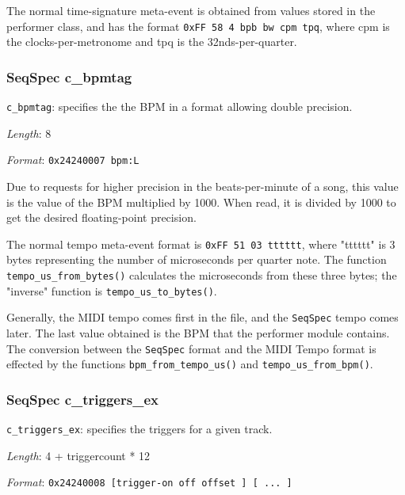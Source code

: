    The normal time-signature meta-event is obtained from values stored in
   the performer class, and has the format
   \texttt{0xFF 58 4 bpb bw cpm tpq}, where cpm is the clocks-per-metronome
   and tpq is the 32nds-per-quarter.

\subsubsection{SeqSpec c\_bpmtag}
\label{subsubsec:midi_format_track_seqspec_bpmtag}


   \begin{description}
      \item \texttt{c\_bpmtag}: specifies the the BPM in a format allowing double
         precision.
      \item \textsl{Length}: 8
      \item \textsl{Format}: \texttt{0x24240007 bpm:L}
   \end{description}

   Due to requests for higher precision in the beats-per-minute of a song, this
   value is the value of the BPM multiplied by 1000.
   When read, it is divided by 1000 to get the desired floating-point precision.

   The normal tempo meta-event format is
   \texttt{0xFF 51 03 tttttt}, where "tttttt" is 3 bytes representing the number
   of microseconds per quarter note.
   The function \texttt{tempo\_us\_from\_bytes()} calculates the microseconds
   from these three bytes; the "inverse" function is
   \texttt{tempo\_us\_to\_bytes()}.

   Generally, the MIDI tempo comes first in the file, and the
   \texttt{SeqSpec} tempo comes later.
   The last value obtained is the BPM that the performer module contains.
   The conversion between the
   \texttt{SeqSpec} format and the MIDI Tempo format is
   effected by the functions
   \texttt{bpm\_from\_tempo\_us()} and \texttt{tempo\_us\_from\_bpm()}.

\subsubsection{SeqSpec c\_triggers\_ex}
\label{subsubsec:midi_format_track_seqspec_triggers_ex}


   \begin{description}
      \item \texttt{c\_triggers\_ex}: specifies the triggers for a given track.
      \item \textsl{Length}: 4 + triggercount * 12
      \item \textsl{Format}: \texttt{0x24240008 [trigger-on off offset ] [ ... ]}
   \end{description}


